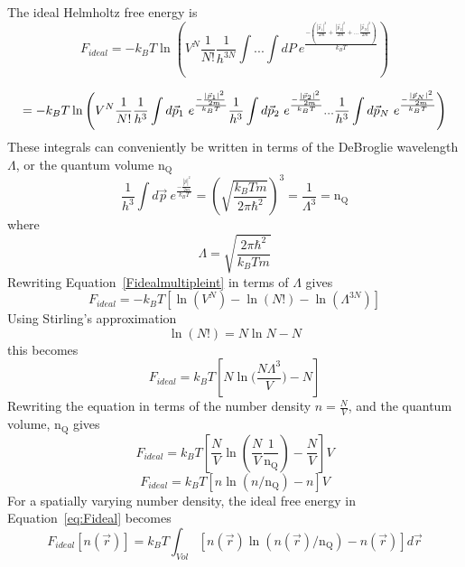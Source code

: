 \documentclass[double,12pt]{beavtex}
\begin{document}
The ideal Helmholtz free energy is
\begin{displaymath}{F_{ideal}=-k_BT\ln{\left(V^N\frac{1}{N!}\frac{1}{h^{3N}}\int{...}\int{dP}~e^\frac{-(\frac{|\vec{p}_1|^2}{2m}+ \frac{|\vec{p}_2|^2}{2m}+...\frac{|\vec{p}_N|^2}{2m})}{k_BT}\right)}}\end{displaymath}  

\begin{equation}{\label{Fidealmultipleint}}{=-k_BT\ln\left(V^N\frac{1}{N!}\frac{1}{h^{3}}\int{d\vec{p}_1}~e^\frac{-\frac{|\vec{p}_1|^2}{2m}}{k_BT}\frac{1}{h^{3}}\int{d\vec{p}_2}~e^\frac{-\frac{|\vec{p}_2|^2}{2m}}{k_BT}{...}\frac{1}{h^{3}}\int{d\vec{p}_N}~e^\frac{-\frac{|\vec{p}_N|^2}{2m}}{k_BT}\right)}\end{equation}
These integrals can conveniently be written in terms of the DeBroglie wavelength $\Lambda$, or the quantum volume $\text{n}_\text{Q}$
\begin{equation}{\frac{1}{h^{3}}\int{d\vec{p}}~e^\frac{-\frac{|\vec{p}|^2}{2m}}{k_BT}=\left(\sqrt{\frac{k_BTm}{2\pi\hbar^2}}\right)^3=\frac{1}{\Lambda^{3}}}=\text{n}_\text{Q}\end{equation} 
where \begin{equation}{\Lambda =\sqrt{\frac{2\pi\hbar^2}{k_BTm}}}\end{equation} 
Rewriting Equation~\ref{Fidealmultipleint} in terms of $\Lambda$ gives
\begin{equation}{F_{ideal}= -k_BT[\ln(V^N)-\ln(N!) - \ln(\Lambda^{3N})]}\end{equation}Using Stirling's approximation \begin{displaymath}{\ln(N!)=N\ln{N}-N}\end{displaymath} this becomes
\begin{equation}{F_{ideal}= k_BT[N\ln(\frac{N\Lambda^{3}}{V}{)-N}]}\end{equation} 
Rewriting the equation in terms of the number density $n=\frac{N}{V}$, and the quantum volume, $\text{n}_\text{Q}$ gives
\begin{equation}{F_{ideal}= k_BT\left[\frac{N}{V}\ln{\left(\frac{N}{V}\frac{1}{\text{n}_\text{Q}}\right)}-\frac{N}{V}\right]}V\end{equation}
\begin{equation}{F_{ideal}= k_BT[n\ln(n/\text{n}_\text{Q})-n]V}\label{eq:Fideal}\end{equation}   
For a spatially varying number density, the ideal free energy in Equation~\ref{eq:Fideal} becomes
\begin{equation}{F_{ideal}[n(\vec{r})]= k_BT\int_{Vol}[n(\vec{r})\ln(n(\vec{r})/\text{n}_\text{Q})-n(\vec{r})]d\vec{r}}\end{equation} 
\end{document}
